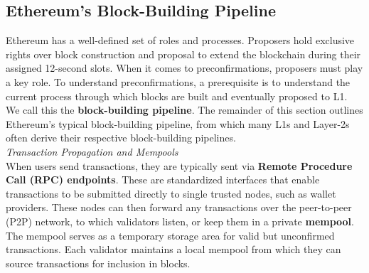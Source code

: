 \documentclass[a4paper]{article}
\theoremstyle{boldstyle}
\newcommand{\qb}[1]{\textcolor{red}{\textbf{Quentin:} #1}}
\newcommand{\todoqb}[1]{\todo[color=red!40]{\textbf{Quentin:} #1}}
\begin{document}
    \subsection{Ethereum's Block-Building Pipeline}
    \label{sec:L1_pipeline}
    Ethereum has a well-defined set of roles and processes. Proposers hold exclusive rights over block construction and proposal to extend the blockchain during their assigned 12-second slots. When it comes to preconfirmations, proposers must play a key role. To understand preconfirmations, a prerequisite is to understand the current process through which blocks are built and eventually proposed to L1. We call this the \textbf{block-building pipeline}. The remainder of this section outlines Ethereum's typical block-building pipeline, from which many L1s and Layer-2s often derive their respective block-building pipelines. \\
    
    \textit{Transaction Propagation and Mempools} \\
        When users send transactions, they are typically sent via \textbf{Remote Procedure Call (RPC) endpoints}. These are standardized interfaces that enable transactions to be submitted directly to single trusted nodes, such as wallet providers. These nodes can then forward any transactions over the peer-to-peer (P2P) network, to which validators listen, or keep them in a private \textbf{mempool}. The mempool serves as a temporary storage area for valid but unconfirmed transactions. Each validator maintains a local mempool from which they can source transactions for inclusion in blocks. \\
        
\end{document}
